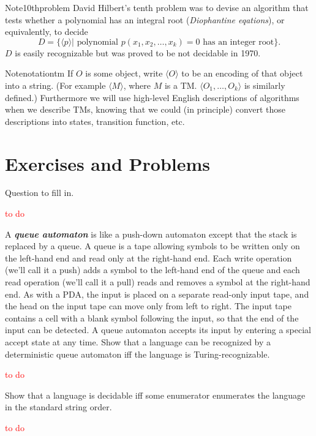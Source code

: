 \begin{reference}{Note}{10thproblem}
  David Hilbert's tenth problem was to devise an algorithm that tests whether a polynomial has an integral root (\textit{Diophantine eqations}), or equivalently, to decide
  \[
    D=\{\langle p\rangle|\text{ polynomial }p(x_1,x_2,\dots,x_k)=0\text{ has an integer root}\}.
  \]
  $D$ is easily recognizable but was proved to be not decidable in 1970.
\end{reference}

\begin{reference}{Note}{notationtm}
  If $O$ is some object, write $\langle O\rangle$ to be an encoding of that object into a string. (For example $\langle M\rangle$, where $M$ is a TM. $\langle O_1,\dots,O_k\rangle$ is similarly defined.) Furthermore we will use high-level English descriptions of algorithms when we describe TMs, knowing that we could (in principle) convert those descriptions into states, transition function, etc.
\end{reference}

\section*{Exercises and Problems}

\setcounter{exercise}{11}

\begin{exercise}
  Question to fill in.
\end{exercise}

\textcolor{red}{to do}

\setcounter{exercise}{13}

\begin{exercise}
  A \textbf{\textit{queue automaton}} is like a push-down automaton except that the stack is replaced by a queue. A queue is a tape allowing symbols to be written only on the left-hand end and read only at the right-hand end. Each write operation (we’ll call it a push) adds a symbol to the left-hand end of the queue and each read operation (we’ll call it a pull) reads and removes a symbol at the right-hand end. As with a PDA, the input is placed on a separate read-only input tape, and the head on the input tape can move only from left to right. The input tape contains a cell with a blank symbol following the input, so that the end of the input can be detected. A queue automaton accepts its input by entering a special accept state at any time. Show that a language can be recognized by a deterministic queue automaton iff the language is Turing-recognizable.
\end{exercise}

\textcolor{red}{to do}

\setcounter{exercise}{17}

\begin{exercise}
  Show that a language is decidable iff some enumerator enumerates the language in the standard string order.
\end{exercise}

\textcolor{red}{to do}
